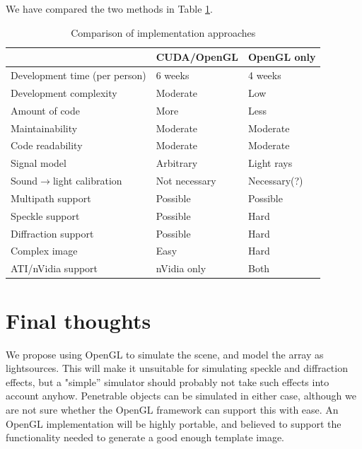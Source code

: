 \documentclass[
   article                                      %
 , 12pt                                         %
 , xelatex                                      %
 , bibtex                                       %
 , layout
]{common/mytemplate}
\begin{document}
We have compared the two methods in Table \ref{comparison}.

\begin{table}[t]\centering
\begin{tabular}[c]{l l l}\hline
\rowcolor{tabBlue}                  & CUDA/OpenGL    & OpenGL only \\\hline
Development time (per person)       & 6 weeks        & 4 weeks     \\
Development complexity              & Moderate       & Low \\
Amount of code                      & More           & Less \\
Maintainability                     & Moderate       & Moderate \\
Code readability                    & Moderate       & Moderate \\
Signal model                        & Arbitrary      & Light rays  \\
Sound$\rightarrow$light calibration & Not necessary  & Necessary(?) \\
Multipath support                   & Possible       & Possible \\
Speckle support                     & Possible       & Hard \\
Diffraction support                 & Possible       & Hard \\
Complex image                       & Easy           & Hard \\
ATI/nVidia support                  & nVidia only    & Both \\
\end{tabular}
\vspace{5pt}\caption{Comparison of implementation approaches}\label{comparison}
\end{table}


\section{Final thoughts}

We propose using OpenGL to simulate the scene, and model the array as lightsources. This will make it unsuitable for simulating speckle and diffraction effects, but a "simple'' simulator should probably not take such effects into account anyhow. Penetrable objects can be simulated in either case, although we are not sure whether the OpenGL framework can support this with ease. An OpenGL implementation will be highly portable, and believed to support the functionality needed to generate a good enough template image.
\end{document}
